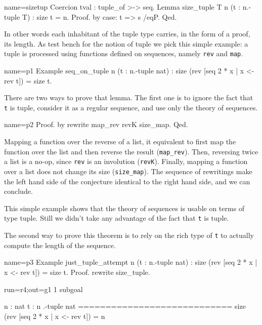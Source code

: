\begin{coq}{name=sizetup}{}
Coercion tval : tuple_of >-> seq.
Lemma size_tuple {T n} (t : n.-tuple T) : size t = n.
Proof. by case: t => s /eqP. Qed.
\end{coq}

In other words each inhabitant of the tuple type carries,
in the form of a proof, its length.  As test bench for the notion
of tuple we pick this simple example: a tuple is processed using
functions defined on sequences, namely \lstinline/rev/ and
\lstinline/map/.

\begin{coq}{name=p1}{}
Example seq_on_tuple n (t : n.-tuple nat) :
  size (rev [seq 2 * x | x <- rev t]) = size t.
\end{coq}

There are two ways to prove that lemma.  The first one is
to ignore the fact that \lstinline/t/ is tuple, consider it
as a regular sequence, and use only the theory of sequences.

\begin{coq}{name=p2}{}
Proof. by rewrite map_rev revK size_map. Qed.
\end{coq}

Mapping a function over the reverse of a list, it equivalent to
first map the function over the list and then reverse the result
(\lstinline/map_rev/).  Then, reversing twice a list is a no-op, since
\lstinline/rev/ is an involution
(\lstinline/revK/).  Finally, mapping a function over a list does not
change its size (\lstinline/size_map/).  The sequence of rewritings
make the left hand side of the conjecture identical to the right hand
side, and we can conclude.

This simple example shows that the theory of sequences is usable
on terms of type tuple.  Still we didn't take any advantage of
the fact that  \lstinline/t/ is tuple.

The second way to prove this theorem is to rely on the rich type
of \lstinline/t/ to actually compute the length of the sequence.

\begin{coq}{name=p3}{}
Example just_tuple_attempt n (t : n.-tuple nat) :
  size (rev [seq 2 * x | x <- rev t]) = size t.
Proof. rewrite size_tuple.
\end{coq}
\begin{coqout}{run=r4;out=g1}{}
1 subgoal

 n : nat
 t : n .-tuple nat
 ============================
 size (rev [seq 2 * x | x <- rev t]) = n
\end{coqout}

